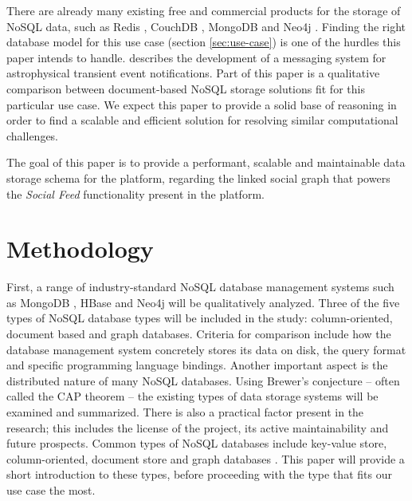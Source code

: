 There are already many existing free and commercial products for the storage of NoSQL data, such as Redis \autocite{Redis}, CouchDB \autocite{CouchDB}, MongoDB \autocite{MongoDB} and Neo4j \autocite{Neo4j}. Finding the right database model for this use case (section \ref{sec:use-case}) is one of the hurdles this paper intends to handle. \textcite{Zhao2015} describes the development of a messaging system for astrophysical transient event notifications. Part of this paper is a qualitative comparison between document-based NoSQL storage solutions fit for this particular use case. We expect this paper to provide a solid base of reasoning in order to find a scalable and efficient solution for resolving similar computational challenges.

The goal of this paper is to provide a performant, scalable and maintainable data storage schema for the \textcite{OpenWebslides} platform, regarding the linked social graph that powers the \textit{Social Feed} functionality present in the platform.


\section{Methodology}
\label{sec:methodology}

First, a range of industry-standard NoSQL database management systems such as MongoDB \autocite{MongoDB}, HBase \autocite{HBase} and Neo4j \autocite{Neo4j} will be qualitatively analyzed. Three of the five types of NoSQL database types \autocite{NayakPoriyaPoojary2003} will be included in the study: column-oriented, document based and graph databases. Criteria for comparison include how the database management system concretely stores its data on disk, the query format and specific programming language bindings. Another important aspect is the distributed nature of many NoSQL databases. Using Brewer's conjecture \autocite{Brewer2002} -- often called the CAP theorem -- the existing types of data storage systems will be examined and summarized. There is also a practical factor present in the research; this includes the license of the project, its active maintainability and future prospects.
Common types of NoSQL databases include key-value store, column-oriented, document store and graph databases \autocite{NayakPoriyaPoojary2003}. This paper will provide a short introduction to these types, before proceeding with the type that fits our use case the most.

